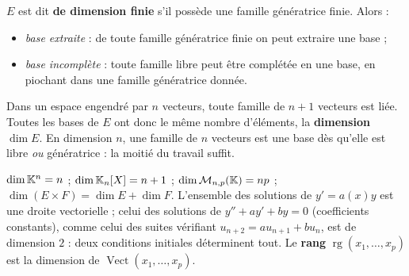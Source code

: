 
\begin{theoreme}
$E$ est dit \textbf{de dimension finie} s'il possède une famille génératrice
finie. Alors :
\begin{itemize}[label={\color{otNavy}\textbullet},leftmargin=1.4em,itemsep=0.6mm,topsep=0.8mm]
  \item \emph{base extraite} : de toute famille génératrice finie on peut
    extraire une base ;
  \item \emph{base incomplète} : toute famille libre peut être complétée en
    une base, en piochant dans une famille génératrice donnée.
\end{itemize}
\end{theoreme}

\begin{theoreme}[Dimension]
Dans un espace engendré par $n$ vecteurs, toute famille de $n+1$ vecteurs
est liée. Toutes les bases de $E$ ont donc le même nombre d'éléments, la
\textbf{dimension} $\dim E$. En dimension $n$, une famille de $n$ vecteurs
est une base dès qu'elle est libre \emph{ou} génératrice : la moitié du
travail suffit.
\end{theoreme}

\begin{propriete}
$\dim\mathbb{K}^{n}=n$ ; $\dim\mathbb{K}_n[X]=n+1$ ; $\dim\mathcal{M}_{n,p}(\mathbb{K})=np$ ;
$\dim(E\times F)=\dim E+\dim F$. L'ensemble des solutions de $y'=a(x)y$ est
une droite vectorielle ; celui des solutions de $y''+ay'+by=0$ (coefficients
constants), comme celui des suites vérifiant $u_{n+2}=au_{n+1}+bu_n$, est de
dimension $2$ : deux conditions initiales déterminent tout. Le \textbf{rang}
$\operatorname{rg}(x_1,\dots,x_p)$ est la dimension de
$\operatorname{Vect}(x_1,\dots,x_p)$.
\end{propriete}


